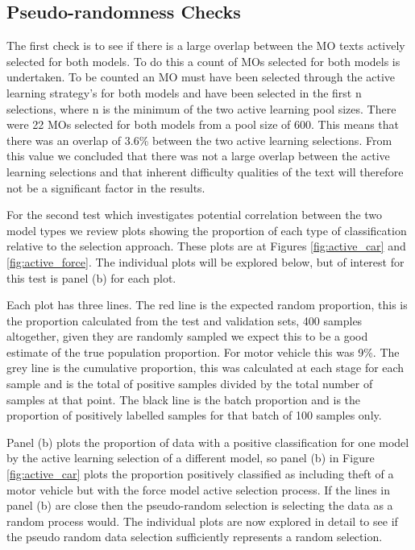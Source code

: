 \subsection{Pseudo-randomness Checks}

The first check is to see if there is a large overlap between the MO texts actively selected for both models. To do this a count of MOs selected for both models is undertaken. To be counted an MO must have been selected through the active learning strategy's for both models and have been selected in the first n selections, where n is the minimum of the two active learning pool sizes. There were 22 MOs selected for both models from a pool size of 600. This means that there was an overlap of 3.6\% between the two active learning selections. From this value we concluded that there was not a large overlap between the active learning selections and that inherent difficulty qualities of the text will therefore not be a significant factor in the results.  

For the second test which investigates potential correlation between the two model types we review plots showing the proportion of each type of classification relative to the selection approach. These plots are at Figures \ref{fig:active_car} and \ref{fig:active_force}. The individual plots will be explored below, but of interest for this test is panel (b) for each plot. 

Each plot has three lines. The red line is the expected random proportion, this is the proportion calculated from the test and validation sets, 400 samples altogether, given they are randomly sampled we expect this to be a good estimate of the true population proportion. For motor vehicle this was 9\%. The grey line is the cumulative proportion, this was calculated at each stage for each sample and is the total of positive samples divided by the total number of samples at that point. The black line is the batch proportion and is the proportion of positively labelled samples for that batch of 100 samples only. 

Panel (b) plots the proportion of data with a positive classification for one model by the active learning selection of a different model, so panel (b) in Figure \ref{fig:active_car} plots the proportion positively classified as including theft of a motor vehicle but with the force model active selection process. If the lines in panel (b) are close then the pseudo-random selection is selecting the data as a random process would. The individual plots are now explored in detail to see if the pseudo random data selection sufficiently represents a random selection. 


